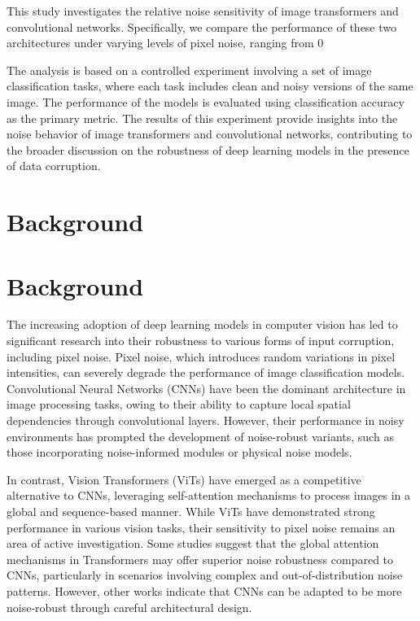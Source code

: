 \documentclass{article}
\begin{document}
This study investigates the relative noise sensitivity of image transformers and convolutional networks. Specifically, we compare the performance of these two architectures under varying levels of pixel noise, ranging from 0%

The analysis is based on a controlled experiment involving a set of image classification tasks, where each task includes clean and noisy versions of the same image. The performance of the models is evaluated using classification accuracy as the primary metric. The results of this experiment provide insights into the noise behavior of image transformers and convolutional networks, contributing to the broader discussion on the robustness of deep learning models in the presence of data corruption.
\section{Background}
\section{Background}

The increasing adoption of deep learning models in computer vision has led to significant research into their robustness to various forms of input corruption, including pixel noise. Pixel noise, which introduces random variations in pixel intensities, can severely degrade the performance of image classification models. Convolutional Neural Networks (CNNs) have been the dominant architecture in image processing tasks, owing to their ability to capture local spatial dependencies through convolutional layers. However, their performance in noisy environments has prompted the development of noise-robust variants, such as those incorporating noise-informed modules or physical noise models. 

In contrast, Vision Transformers (ViTs) have emerged as a competitive alternative to CNNs, leveraging self-attention mechanisms to process images in a global and sequence-based manner. While ViTs have demonstrated strong performance in various vision tasks, their sensitivity to pixel noise remains an area of active investigation. Some studies suggest that the global attention mechanisms in Transformers may offer superior noise robustness compared to CNNs, particularly in scenarios involving complex and out-of-distribution noise patterns. However, other works indicate that CNNs can be adapted to be more noise-robust through careful architectural design. 
\end{document}
